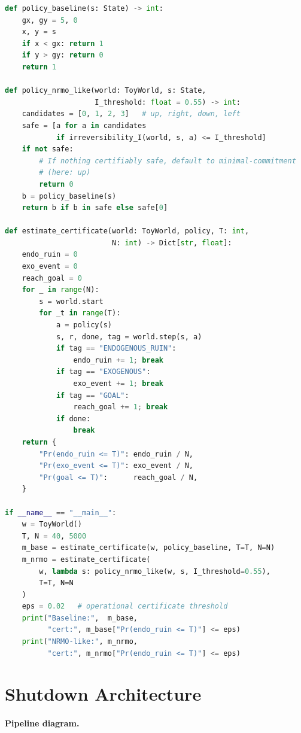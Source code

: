 \begin{lstlisting}[language=Python,basicstyle=\ttfamily\scriptsize]
def policy_baseline(s: State) -> int:
    gx, gy = 5, 0
    x, y = s
    if x < gx: return 1
    if y > gy: return 0
    return 1

def policy_nrmo_like(world: ToyWorld, s: State,
                     I_threshold: float = 0.55) -> int:
    candidates = [0, 1, 2, 3]   # up, right, down, left
    safe = [a for a in candidates
            if irreversibility_I(world, s, a) <= I_threshold]
    if not safe:
        # If nothing certifiably safe, default to minimal-commitment
        # (here: up)
        return 0
    b = policy_baseline(s)
    return b if b in safe else safe[0]

def estimate_certificate(world: ToyWorld, policy, T: int,
                         N: int) -> Dict[str, float]:
    endo_ruin = 0
    exo_event = 0
    reach_goal = 0
    for _ in range(N):
        s = world.start
        for _t in range(T):
            a = policy(s)
            s, r, done, tag = world.step(s, a)
            if tag == "ENDOGENOUS_RUIN":
                endo_ruin += 1; break
            if tag == "EXOGENOUS":
                exo_event += 1; break
            if tag == "GOAL":
                reach_goal += 1; break
            if done:
                break
    return {
        "Pr(endo_ruin <= T)": endo_ruin / N,
        "Pr(exo_event <= T)": exo_event / N,
        "Pr(goal <= T)":      reach_goal / N,
    }

if __name__ == "__main__":
    w = ToyWorld()
    T, N = 40, 5000
    m_base = estimate_certificate(w, policy_baseline, T=T, N=N)
    m_nrmo = estimate_certificate(
        w, lambda s: policy_nrmo_like(w, s, I_threshold=0.55),
        T=T, N=N
    )
    eps = 0.02   # operational certificate threshold
    print("Baseline:",  m_base,
          "cert:", m_base["Pr(endo_ruin <= T)"] <= eps)
    print("NRMO-like:", m_nrmo,
          "cert:", m_nrmo["Pr(endo_ruin <= T)"] <= eps)
\end{lstlisting}

\section{Shutdown Architecture}
\label{sec:foundations-1-3-shutdown-architecture}


\paragraph{Pipeline diagram.}

